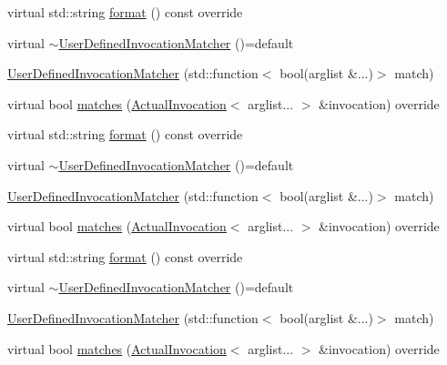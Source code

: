\begin{DoxyCompactItemize}
\item 
virtual std\+::string \mbox{\hyperlink{structfakeit_1_1UserDefinedInvocationMatcher_a8090f8ab0af9c775f833e725f4414368}{format}} () const override
\item 
virtual \mbox{\hyperlink{structfakeit_1_1UserDefinedInvocationMatcher_a4bf5571d7a4cac54d1cad8aad72ae638}{$\sim$\+User\+Defined\+Invocation\+Matcher}} ()=default
\item 
\mbox{\hyperlink{structfakeit_1_1UserDefinedInvocationMatcher_a99e448ddbbf9e200f34e80b745ec4ad0}{User\+Defined\+Invocation\+Matcher}} (std\+::function$<$ bool(arglist \&...)$>$ match)
\item 
virtual bool \mbox{\hyperlink{structfakeit_1_1UserDefinedInvocationMatcher_a52f5b5e7de4484b7e9fecb166f6b80e2}{matches}} (\mbox{\hyperlink{structfakeit_1_1ActualInvocation}{Actual\+Invocation}}$<$ arglist... $>$ \&invocation) override
\item 
virtual std\+::string \mbox{\hyperlink{structfakeit_1_1UserDefinedInvocationMatcher_a8090f8ab0af9c775f833e725f4414368}{format}} () const override
\item 
virtual \mbox{\hyperlink{structfakeit_1_1UserDefinedInvocationMatcher_a4bf5571d7a4cac54d1cad8aad72ae638}{$\sim$\+User\+Defined\+Invocation\+Matcher}} ()=default
\item 
\mbox{\hyperlink{structfakeit_1_1UserDefinedInvocationMatcher_a99e448ddbbf9e200f34e80b745ec4ad0}{User\+Defined\+Invocation\+Matcher}} (std\+::function$<$ bool(arglist \&...)$>$ match)
\item 
virtual bool \mbox{\hyperlink{structfakeit_1_1UserDefinedInvocationMatcher_a52f5b5e7de4484b7e9fecb166f6b80e2}{matches}} (\mbox{\hyperlink{structfakeit_1_1ActualInvocation}{Actual\+Invocation}}$<$ arglist... $>$ \&invocation) override
\item 
virtual std\+::string \mbox{\hyperlink{structfakeit_1_1UserDefinedInvocationMatcher_a8090f8ab0af9c775f833e725f4414368}{format}} () const override
\item 
virtual \mbox{\hyperlink{structfakeit_1_1UserDefinedInvocationMatcher_a4bf5571d7a4cac54d1cad8aad72ae638}{$\sim$\+User\+Defined\+Invocation\+Matcher}} ()=default
\item 
\mbox{\hyperlink{structfakeit_1_1UserDefinedInvocationMatcher_a99e448ddbbf9e200f34e80b745ec4ad0}{User\+Defined\+Invocation\+Matcher}} (std\+::function$<$ bool(arglist \&...)$>$ match)
\item 
virtual bool \mbox{\hyperlink{structfakeit_1_1UserDefinedInvocationMatcher_a52f5b5e7de4484b7e9fecb166f6b80e2}{matches}} (\mbox{\hyperlink{structfakeit_1_1ActualInvocation}{Actual\+Invocation}}$<$ arglist... $>$ \&invocation) override

\end{DoxyCompactItemize}
